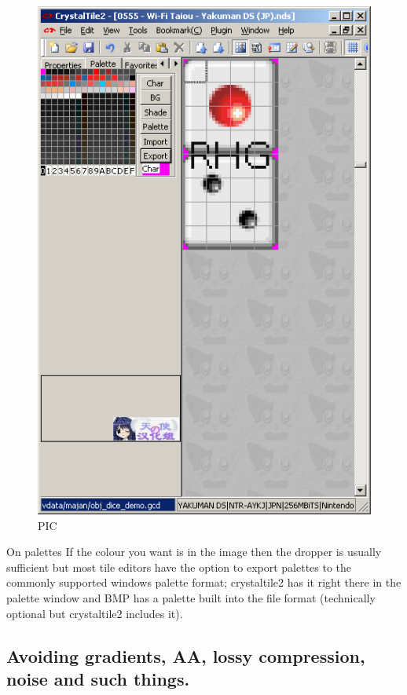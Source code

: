 \documentclass[
]{book}
\begin{document}
\begin{figure}
\centering
\includegraphics{images/29_home_fast6191_romhackingguide_unrenamed_file____borders_romhackingguidecrystaltile2export4.png}
\caption{PIC}
\end{figure}

On palettes If the colour you want is in the image then the dropper is usually sufficient but most tile editors have the option to export palettes to the commonly supported windows palette format; crystaltile2 has it right there in the palette window and BMP has a palette built into the file format (technically optional but crystaltile2 includes it).

\hypertarget{avoiding-gradients-aa-lossy-compression-noise-and-such-things.}{%
\subsection{Avoiding gradients, AA, lossy compression, noise and such things.}\label{avoiding-gradients-aa-lossy-compression-noise-and-such-things.}}
\end{document}
